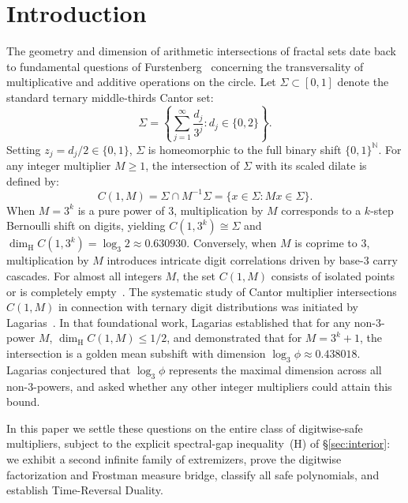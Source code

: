 \documentclass[11pt,reqno]{amsart}
\theoremstyle{plain}
\theoremstyle{definition}
\theoremstyle{remark}
\newcommand{\N}{\mathbb{N}}
\newcommand{\dimH}{\dim_{\mathrm{H}}}
\begin{document}
\tableofcontents
\clearpage

\section{Introduction}

The geometry and dimension of arithmetic intersections of fractal sets date back to fundamental questions of Furstenberg~\cite{Furstenberg1970} concerning the transversality of multiplicative and additive operations on the circle. Let $\Sigma \subset [0, 1]$ denote the standard ternary middle-thirds Cantor set:
\begin{equation}
\Sigma = \left\{ \sum_{j=1}^\infty \frac{d_j}{3^j} : d_j \in \{0, 2\} \right\}.
\end{equation}
Setting $z_j = d_j / 2 \in \{0, 1\}$, $\Sigma$ is homeomorphic to the full binary shift $\{0, 1\}^\N$. For any integer multiplier $M \ge 1$, the intersection of $\Sigma$ with its scaled dilate is defined by:
\begin{equation}
C(1, M) = \Sigma \cap M^{-1} \Sigma = \{ x \in \Sigma : M x \in \Sigma \}.
\end{equation}
When $M = 3^k$ is a pure power of $3$, multiplication by $M$ corresponds to a $k$-step Bernoulli shift on digits, yielding $C(1, 3^k) \cong \Sigma$ and $\dimH C(1, 3^k) = \log_3 2 \approx 0.630930$. Conversely, when $M$ is coprime to $3$, multiplication by $M$ introduces intricate digit correlations driven by base-$3$ carry cascades. For almost all integers $M$, the set $C(1, M)$ consists of isolated points or is completely empty~\cite{KenyonPeres1996,HochmanShmerkin2012}. The systematic study of Cantor multiplier intersections $C(1, M)$ in connection with ternary digit distributions was initiated by Lagarias~\cite{Lagarias2009}. In that foundational work, Lagarias established that for any non-$3$-power $M$, $\dimH C(1, M) \le 1/2$, and demonstrated that for $M = 3^k + 1$, the intersection is a golden mean subshift with dimension $\log_3 \phi \approx 0.438018$. Lagarias conjectured that $\log_3 \phi$ represents the maximal dimension across all non-$3$-powers, and asked whether any other integer multipliers could attain this bound.

In this paper we settle these questions on the entire class of digitwise-safe multipliers, subject to the explicit spectral-gap inequality~(H) of \S\ref{sec:interior}: we exhibit a second infinite family of extremizers, prove the digitwise factorization and Frostman measure bridge, classify all safe polynomials, and establish Time-Reversal Duality.
\end{document}
